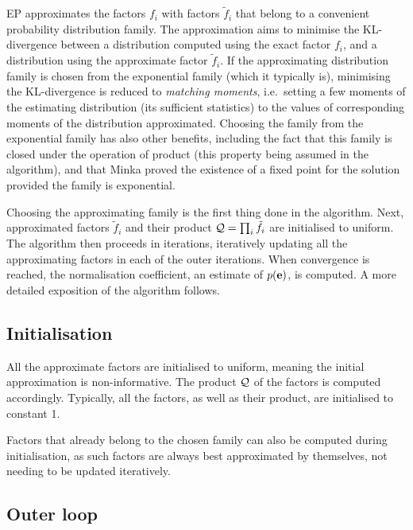 \documentclass[11pt]{article}
\begin{document}
EP approximates the factors $f_i$ with factors $\tilde{f}_i$ that belong to 
a convenient probability distribution family. The approximation aims to 
minimise the KL-divergence between a distribution computed using the exact 
factor $f_i$, and a distribution using the approximate factor 
$\tilde{f}_i$. If the approximating distribution family is chosen from the 
exponential family (which it typically is), minimising the KL-divergence is 
reduced to \emph{matching moments}, i.e.\ setting a few moments of the 
estimating distribution (its sufficient statistics) to the values of 
corresponding moments of the distribution approximated. Choosing the family 
from the exponential family has also other benefits, including the fact 
that this family is closed under the operation of product (this property 
being assumed in the algorithm), and that Minka
\cite{minka_expectation_2001} proved the existence of a fixed point for the 
solution provided the family is exponential.

Choosing the approximating family is the first thing done in the algorithm.  
Next, approximated factors $\tilde{f}_i$ and their product $\mathcal{Q} 
= \prod_i{\tilde{f}_i}$ are initialised to uniform.  The algorithm then 
proceeds in iterations, iteratively updating all the approximating factors 
in each of the outer iterations. When convergence is reached, the 
normalisation coefficient, an estimate of $p(\mathbf{e})$, is computed. A more 
detailed exposition of the algorithm follows.

\renewcommand{\thesubsection}{\arabic{subsection}.}
\renewcommand{\thesubsubsection}{\arabic{subsection}.\arabic{subsubsection}.}
\subsection{Initialisation}
All the approximate factors are initialised to uniform, meaning the initial 
approximation is non-informative.  The product $\mathcal{Q}$ of the factors is 
computed accordingly. Typically, all the factors, as well as their product, 
are initialised to constant 1.

Factors that already belong to the chosen family can also be computed 
during initialisation, as such factors are always best approximated by 
themselves, not needing to be updated iteratively.


\subsection{Outer loop}
\end{document}
